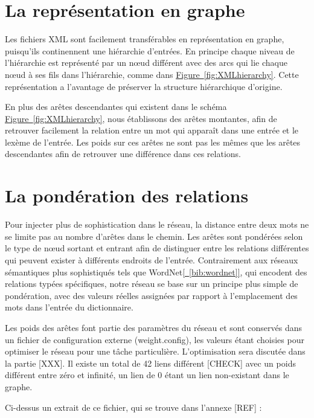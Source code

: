 \documentclass[a4paper, 12pt]{article}
\begin{document}
\section{La représentation en graphe}

Les fichiers XML sont facilement transférables en représentation en graphe, puisqu'ils continennent une hiérarchie d'entrées. En principe chaque niveau de l'hiérarchie est représenté par un nœud différent avec des arcs qui lie chaque nœud à ses fils dans l'hiérarchie, comme dans \hyperref[fig:XMLhierarchy]{Figure~\ref*{fig:XMLhierarchy}}. Cette représentation a l'avantage de préserver la structure hiérarchique d'origine.

En plus des arêtes descendantes qui existent dans le schéma \hyperref[fig:XMLhierarchy]{Figure~\ref*{fig:XMLhierarchy}}, nous établissons des arêtes montantes, afin de retrouver facilement la relation entre un mot qui apparaît dans une entrée et le lexème de l'entrée. Les poids sur ces arêtes ne sont pas les mêmes que les arêtes descendantes afin de retrouver une différence dans ces relations.


\section{La pondération des relations}

Pour injecter plus de sophistication dans le réseau, la distance entre deux mots ne se limite pas au nombre d'arêtes dans le chemin. Les arêtes sont pondérées selon le type de nœud sortant et entrant afin de distinguer entre les relations différentes qui peuvent exister à différents endroits de l'entrée. Contrairement aux réseaux sémantiques plus sophistiqués tels que WordNet\hyperref[bib:wordnet]{[~\ref*{bib:wordnet}]}, qui encodent des relations typées spécifiques, notre réseau se base sur un principe plus simple de pondération, avec des valeurs réelles assignées par rapport à l'emplacement des mots dans l'entrée du dictionnaire.

Les poids des arêtes font partie des paramètres du réseau et sont conservés dans un fichier de configuration externe (weight.config), les valeurs étant choisies pour optimiser le réseau pour une tâche particulière. L'optimisation sera discutée dans la partie [XXX]. Il existe un total de 42 liens différent [CHECK] avec un poids différent entre zéro et infinité, un lien de 0 étant un lien non-existant dans le graphe.

Ci-dessus un extrait de ce fichier, qui se trouve dans l'annexe [REF] :
\end{document}
